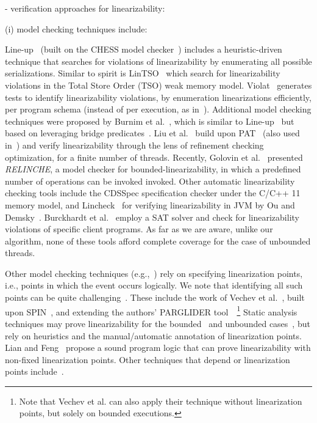 - verification approaches for linearizability:



(i) model checking techniques include:

Line-up~\cite{BuDeMuTa10} (built on the CHESS model checker~\cite{MuQaBaBaNaNe08}) includes a heuristic-driven technique that searches for violations of linearizability by enumerating all possible serializations. Similar to spirit is LinTSO~\cite{BuGoMuYa12} which search for linearizability violations in the Total Store
Order (TSO) weak memory model.
%
Violat~\cite{EmEn19} generates tests to identify linearizability violations, by 
enumeration linearizations efficiently, per program schema (instead of per 
execution, as in~\cite{BuDeMuTa10}).
%
Additional model checking techniques were proposed by Burnim et al.~\cite{BuNeSe11}, which is similar to  Line-up~\cite{BuDeMuTa10} but based on leveraging bridge predicates~\cite{BuSe09}. 
Liu et al.~\cite{LiChLiSuZhDo12} build upon PAT~\cite{SuLuDoPa09} (also used in~\cite{LiChLiSu09,Zh11}) and verify linearizability through the lens of refinement checking optimization, for a finite number of threads.
%
%
Recently, Golovin et al.~\cite{GoKoVa25} presented \textit{RELINCHE}, a model checker for bounded-linearizability, in which a predefined number of operations can be invoked invoked.
%
Other automatic linearizability checking tools include the CDSSpec specification checker under the C/C++ 11 memory model, and Lincheck~\cite{KoDeSoTsAl23} for verifying linearizability in JVM by Ou and Demsky~\cite{OuDe17}. 
%
Burckhardt et al.~\cite{BuAlMa07} employ a SAT solver and check for linearizability violations of specific client programs.
%
As far as we are aware, unlike our algorithm, none of these tools afford complete coverage for the case of unbounded threads.
%

Other model checking techniques (e.g.,~\cite{Fl04}) rely on specifying linearization points, i.e., points in which the event occurs logically. We note that identifying all such points can be quite challenging~\cite{VeYaYo09}.
%
These include the work of Vechev et al.~\cite{VeYaYo09}, built upon SPIN~\cite{Ho97}, and extending the authors' PARGLIDER tool~\cite{VeYa08}~\footnote{Note that Vechev et al. can also apply their technique without linearization points, but solely on bounded executions.}
%
Static analysis techniques may prove linearizability for the 
bounded~\cite{AmRiReSaYa07, BeLeMaRaSa08, MaLeSaRaBe08} and unbounded cases~\cite{BeLeMaRaSa08, Va09, 
Va10}, but rely on heuristics and the manual/automatic annotation of 
linearization points. 
%
Lian and Feng~\cite{LiFe13} propose a sound program logic that can prove 
linearizability with non-fixed linearization points.
%
Other techniques that depend or linearization points 
include~\cite{OhRiVeYaYo10, ZhPeHa15, AbJoTr16}. 
%

